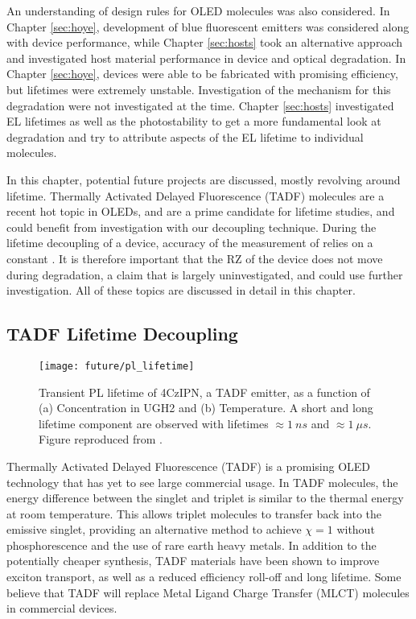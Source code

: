 \documentclass[../thesis.tex]{subfiles}
\begin{document}
An understanding of design rules for OLED molecules was also considered.
In Chapter \ref{sec:hoye}, development of blue fluorescent emitters was considered along with device performance, while Chapter \ref{sec:hosts} took an alternative approach and investigated host material performance in device and optical degradation.
In Chapter \ref{sec:hoye}, devices were able to be fabricated with promising efficiency, but lifetimes were extremely unstable.
Investigation of the mechanism for this degradation were not investigated at the time.
Chapter \ref{sec:hosts} investigated EL lifetimes as well as the photostability to get a more fundamental look at degradation and try to attribute aspects of the EL lifetime to individual molecules.

In this chapter, potential future projects are discussed, mostly revolving around lifetime.
Thermally Activated Delayed Fluorescence (TADF) molecules are a recent hot topic in OLEDs, and are a prime candidate for lifetime studies, and could benefit from investigation with our decoupling technique.
During the lifetime decoupling of a device, accuracy of the measurement of \pl relies on a constant \oc.
It is therefore important that the RZ of the device does not move during degradation, a claim that is largely uninvestigated, and could use further investigation.
All of these topics are discussed in detail in this chapter.

\subsection{TADF Lifetime Decoupling}

\begin{wrapfigure}{r}{.5\textwidth}
\centering
\texttt{[image: future/pl\_lifetime]}
\caption{Transient PL lifetime of 4CzIPN, a TADF emitter, as a function of (a) Concentration in UGH2 and (b) Temperature.  A short and long lifetime component are observed with lifetimes $\approx 1\ ns$ and $\approx 1\ \mu s$.  Figure reproduced from \textcite{Menke2016}.}
\label{fig:future_pl_lifetime}
\end{wrapfigure}

Thermally Activated Delayed Fluorescence (TADF) is a promising OLED technology that has yet to see large commercial usage.\supercite{Endo2009,Zhang2012b,Uoyama2012,Zhang2012c,Li2013}
In TADF molecules, the energy difference between the singlet and triplet is similar to the thermal energy at room temperature.  
This allows triplet molecules to transfer back into the emissive singlet, providing an alternative method to achieve $\chi=1$ without phosphorescence and the use of rare earth heavy metals.
In addition to the potentially cheaper synthesis, TADF materials have been shown to improve exciton transport,\supercite{Menke2016} as well as a reduced efficiency roll-off\supercite{Inoue2016,Wang2015} and long lifetime.\supercite{Cho2014,Mehes2014}
Some believe that TADF will replace Metal Ligand Charge Transfer (MLCT) molecules in commercial devices.\supercite{Reineke2014a}
\end{document}
